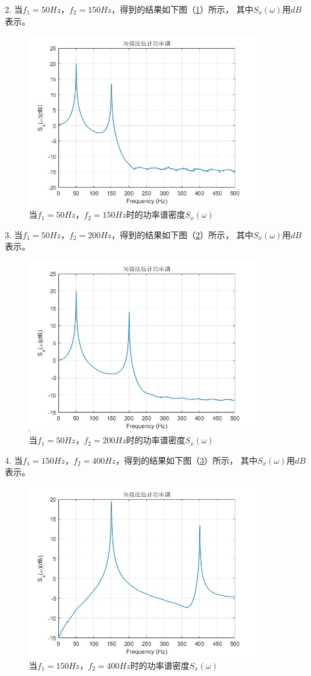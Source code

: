 \documentclass[UTF-8, a4paper, 12pt]{ctexart}
\begin{document}
2. 当$f_1=50Hz$，$ f_2=150Hz$，得到的结果如下图（\ref{f72}）所示，
其中$S_x(\omega)$用$dB$表示。
\begin{figure}[htbp]
    \centering
    \includegraphics[width=10cm]{figs/f72.jpg}
    \caption{当$f_1=50Hz$，$f_2=150Hz$时的功率谱密度$S_x(\omega)$}
    \label{f72}
\end{figure}

3. 当$f_1=50Hz$，$ f_2=200Hz$，得到的结果如下图（\ref{f73}）所示，
其中$S_x(\omega)$用$dB$表示。
\begin{figure}[htbp]
    \centering
    \includegraphics[width=10cm]{figs/f73.jpg}
    \caption{当$f_1=50Hz$，$f_2=200Hz$时的功率谱密度$S_x(\omega)$}
    \label{f73}
\end{figure}\newpage

4. 当$f_1=150Hz$，$ f_2=400Hz$，得到的结果如下图（\ref{f74}）所示，
其中$S_x(\omega)$用$dB$表示。
\begin{figure}[htbp]
    \centering
    \includegraphics[width=10cm]{figs/f74.jpg}
    \caption{当$f_1=150Hz$，$f_2=400Hz$时的功率谱密度$S_x(\omega)$}
    \label{f74}
\end{figure}
\end{document}
